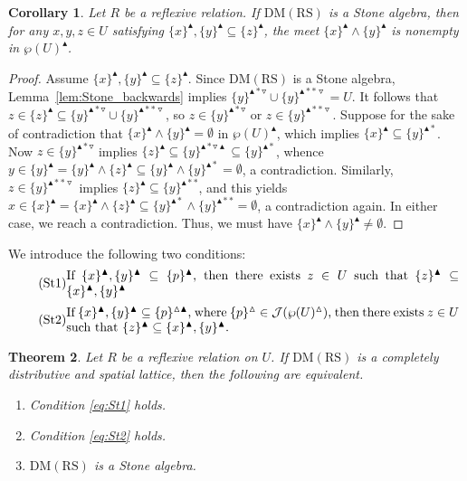 \documentclass[11pt,a4paper]{amsart}
\newcommand{\UP}{\blacktriangle}
\newcommand{\Up}{\vartriangle}
\newcommand{\Down}{\triangledown}
\theoremstyle{plain}
\newtheorem{theorem}{Theorem}[section]
\newtheorem{corollary}[theorem]{Corollary}
\theoremstyle{definition}
\theoremstyle{remark}
\numberwithin{equation}{section}
\begin{document}
\begin{corollary} \label{cor:Stone_nonempty}
Let $R$ be a reflexive relation. If $\mathrm{DM(RS)}$ is a Stone algebra, 
then for any $x,y,z\in U$ satisfying 
$\{x\}^\UP,\{y\}^\UP \subseteq \{z\}^\UP$, the meet
$\{x\}^\UP\wedge\{y\}^\UP$ is nonempty in $\wp(U)^\UP$.
\end{corollary}

\begin{proof} Assume $\{x\}^\UP,\{y\}^\UP \subseteq \{z\}^\UP$. 
Since  $\mathrm{DM(RS)}$ is a Stone algebra,
Lemma~\ref{lem:Stone_backwards} implies 
$\{y\}^{\UP * \Down} \cup\{y\}^{\UP **\Down} = U$.
It follows that $z\in\{z\}^\UP \subseteq 
\{y\}^{\UP * \Down}\cup\{y\}^{\UP**\Down}$, so
$z\in\{y\}^{\UP * \Down}$ or $z\in\{y\}^{\UP ** \Down}$. 
Suppose for the sake of contradiction that 
$\{x\}^\UP\wedge \{y\}^\UP=\emptyset$ in $\wp(U)^\UP$, which implies
$\{x\}^\UP \subseteq \{y\}^{\UP *}$. 
Now $z\in\{y\}^{\UP * \Down}$
implies $\{z\}^\UP\subseteq \{y\}^{\UP * \Down \UP} \subseteq
\{y\}^{\UP *}$, whence $y\in\{y\}^\UP = \{y\}^\UP\wedge \{z\}^\UP \subseteq 
\{y\}^\UP\wedge \{y\}^{\UP * }=\emptyset$, a contradiction. 
Similarly, $z\in\{y\}^{\UP**\Down}$ implies
$\{z\}^\UP\subseteq\{y\}^{\UP**}$, and this
yields $x\in\{x\}^\UP = \{x\}^\UP\wedge \{z\}^\UP \subseteq
\{y\}^{\UP *} \wedge \{y\}^{\UP**} = \emptyset$, a contradiction again. 
In either case, we reach a contradiction. Thus, we must have
$\{x\}^\UP\wedge\{y\}^\UP\neq\emptyset$.
\end{proof}

We introduce the following two conditions:
\begin{equation} \tag{St1} \label{eq:St1}
\begin{minipage}[c]{0.9\textwidth}
     If $\{x\}^\UP, \{y\}^\UP \subseteq \{p\}^\UP$, then there exists $z \in U$ such that $\{z\}^\UP \subseteq \{x\}^\UP, \{y\}^\UP$
\end{minipage}
\end{equation}
\begin{equation} \tag{St2} \label{eq:St2}
\begin{minipage}[c]{0.9\textwidth}
    If $\{x\}^\UP, \{y\}^\UP \subseteq \{p\}^{\Up \UP}$, where $\{p\}^\Up \in \mathcal{J}(\wp(U)^\Up)$, then
    there exists $z \in U$ such that $\{z\}^\UP \subseteq \{x\}^\UP, \{y\}^\UP$.
\end{minipage}
\end{equation}


\begin{theorem} \label{thm:Stone}
Let $R$ be a reflexive relation on $U$. If $\mathrm{DM(RS)}$ is a completely 
distributive and spatial lattice, then the following are equivalent.
\begin{enumerate}[label={\rm (\roman*)}]
\item Condition \eqref{eq:St1} holds.
\item Condition \eqref{eq:St2} holds.
\item $\mathrm{DM(RS)}$ is a Stone algebra.
\end{enumerate}
\end{theorem}
\end{document}
